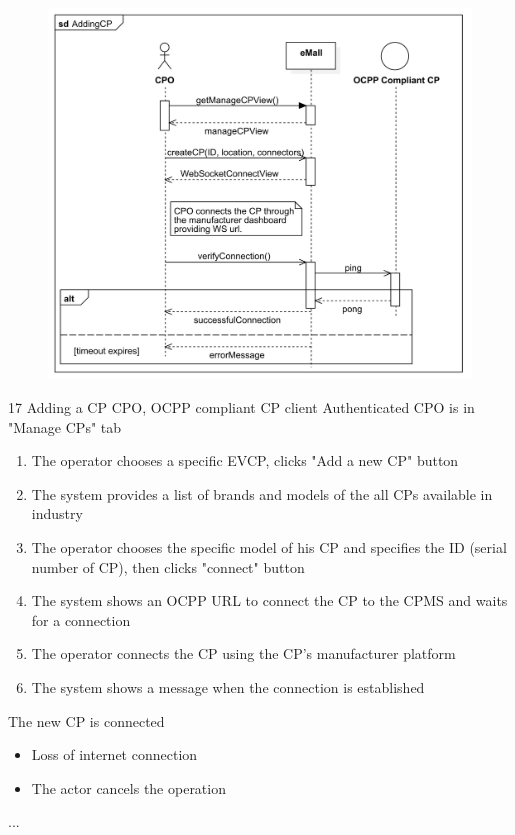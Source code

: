 \usecase
{
    \begin{figure}[H]
        \centering
        \includegraphics[scale=0.9]{src/sequence_diagram/addingCP.png}
    \end{figure}
}
{17}
{Adding a CP} %
{CPO, OCPP compliant CP client} %
{Authenticated CPO is in "Manage CPs" tab} %
{ %
    \begin{enumerate}
        \item The operator chooses a specific EVCP, clicks "Add a new CP" button
        \item The system provides a list of brands and models of the all CPs available in industry
        \item The operator chooses the specific model of his CP and specifies the ID (serial number of CP), then clicks "connect" button
        \item The system shows an OCPP URL to connect the CP to the CPMS and waits for a connection
        \item The operator connects the CP using the CP's manufacturer platform
        \item The system shows a message when the connection is established
    \end{enumerate}
}
{The new CP is connected} %
{ %
    \begin{itemize}
        \item Loss of internet connection
        \item The actor cancels the operation
    \end{itemize}
}
{ %
    ...
}

